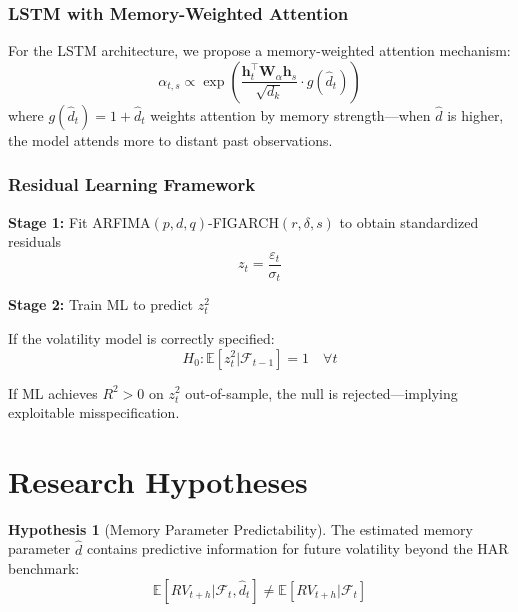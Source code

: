 \documentclass[11pt,a4paper]{article}
\theoremstyle{definition}
\newtheorem{hypothesis}{Hypothesis}[section]
\newcommand{\E}{\mathbb{E}}
\newcommand{\dhat}{\hat{d}}
\begin{document}
\subsubsection{LSTM with Memory-Weighted Attention}

For the LSTM architecture, we propose a memory-weighted attention mechanism:
\begin{equation}
    \alpha_{t,s} \propto \exp\left(\frac{\mathbf{h}_t^\top \mathbf{W}_\alpha \mathbf{h}_s}{\sqrt{d_k}} \cdot g(\dhat_t)\right)
\end{equation}
where $g(\dhat_t) = 1 + \dhat_t$ weights attention by memory strength---when $\dhat$ is higher, the model attends more to distant past observations.

\subsubsection{Residual Learning Framework}

\textbf{Stage 1:} Fit ARFIMA$(p,d,q)$-FIGARCH$(r,\delta,s)$ to obtain standardized residuals
\begin{equation}
    z_t = \frac{\varepsilon_t}{\sigma_t}
\end{equation}

\textbf{Stage 2:} Train ML to predict $z_t^2$

If the volatility model is correctly specified:
\begin{equation}
    H_0: \E[z_t^2 | \mathcal{F}_{t-1}] = 1 \quad \forall t
\end{equation}

If ML achieves $R^2 > 0$ on $z_t^2$ out-of-sample, the null is rejected---implying exploitable misspecification.

\section{Research Hypotheses}

\begin{hypothesis}[Memory Parameter Predictability]
The estimated memory parameter $\dhat$ contains predictive information for future volatility beyond the HAR benchmark:
\begin{equation}
    \E[RV_{t+h} | \mathcal{F}_t, \dhat_t] \neq \E[RV_{t+h} | \mathcal{F}_t]
\end{equation}
\end{hypothesis}
\end{document}
